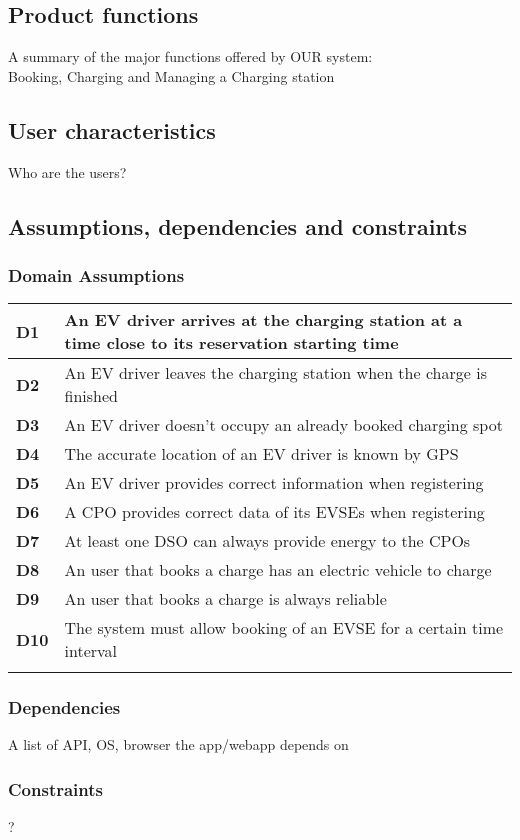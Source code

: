 \subsection{Product functions}
A summary of the major functions offered by OUR system:\\ Booking, Charging and Managing a Charging station


\subsection{User characteristics}
Who are the users?

\subsection{Assumptions, dependencies and constraints}
\subsubsection*{Domain Assumptions}
\begin{table}[h]
      \begin{tabular}{|l|l|}
            \toprule
            \textbf{D1}  & An EV driver arrives at the charging station at a time close to its reservation starting time \\ \midrule
            \textbf{D2}  & An EV driver leaves the charging station when the charge is finished                          \\ \midrule
            \textbf{D3}  & An EV driver doesn't occupy an already booked charging spot                                   \\ \midrule
            \textbf{D4}  & The accurate location of an EV driver is known by GPS                                         \\ \midrule
            \textbf{D5}  & An EV driver provides correct information when registering                                    \\ \midrule
            \textbf{D6}  & A CPO provides correct data of its EVSEs when registering                                     \\ \midrule
            \textbf{D7}  & At least one DSO can always provide energy to the CPOs                                        \\ \midrule
            \textbf{D8}  & An user that books a charge has an electric vehicle to charge                                 \\ \midrule
            \textbf{D9}  & An user that books a charge is always reliable                                                \\ \midrule
            \textbf{D10} & The system must allow booking of an EVSE for a certain time interval                          \\ \midrule
                         &                                                                                               \\ \bottomrule
      \end{tabular}
\end{table}
\subsubsection*{Dependencies}
A list of API, OS, browser the app/webapp depends on
\subsubsection*{Constraints}
?
